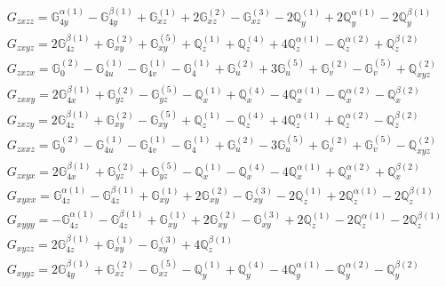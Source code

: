 \documentclass[fleqn,8pt,landscape]{jsarticle}
\begin{document}
\begin{align*}
& G_{zxzz} = \mathbb{G}_{4y}^{\alpha(1)} - \mathbb{G}_{4y}^{\beta(1)} + \mathbb{G}_{xz}^{(1)} + 2 \mathbb{G}_{xz}^{(2)} - \mathbb{G}_{xz}^{(3)} - 2 \mathbb{Q}_{y}^{(1)} + 2 \mathbb{Q}_{y}^{\alpha(1)} - 2 \mathbb{Q}_{y}^{\beta(1)} \\
& G_{zxyz} = 2 \mathbb{G}_{4z}^{\beta(1)} + \mathbb{G}_{xy}^{(2)} + \mathbb{G}_{xy}^{(5)} + \mathbb{Q}_{z}^{(1)} + \mathbb{Q}_{z}^{(4)} + 4 \mathbb{Q}_{z}^{\alpha(1)} - \mathbb{Q}_{z}^{\alpha(2)} + \mathbb{Q}_{z}^{\beta(2)} \\
& G_{zxzx} = \mathbb{G}_{0}^{(2)} - \mathbb{G}_{4u}^{(1)} - \mathbb{G}_{4v}^{(1)} - \mathbb{G}_{4}^{(1)} + \mathbb{G}_{u}^{(2)} + 3 \mathbb{G}_{u}^{(5)} + \mathbb{G}_{v}^{(2)} - \mathbb{G}_{v}^{(5)} + \mathbb{Q}_{xyz}^{(2)} \\
& G_{zxxy} = 2 \mathbb{G}_{4x}^{\beta(1)} + \mathbb{G}_{yz}^{(2)} - \mathbb{G}_{yz}^{(5)} - \mathbb{Q}_{x}^{(1)} + \mathbb{Q}_{x}^{(4)} - 4 \mathbb{Q}_{x}^{\alpha(1)} - \mathbb{Q}_{x}^{\alpha(2)} - \mathbb{Q}_{x}^{\beta(2)} \\
& G_{zxzy} = 2 \mathbb{G}_{4z}^{\beta(1)} + \mathbb{G}_{xy}^{(2)} - \mathbb{G}_{xy}^{(5)} + \mathbb{Q}_{z}^{(1)} - \mathbb{Q}_{z}^{(4)} + 4 \mathbb{Q}_{z}^{\alpha(1)} + \mathbb{Q}_{z}^{\alpha(2)} - \mathbb{Q}_{z}^{\beta(2)} \\
& G_{zxxz} = \mathbb{G}_{0}^{(2)} - \mathbb{G}_{4u}^{(1)} - \mathbb{G}_{4v}^{(1)} - \mathbb{G}_{4}^{(1)} + \mathbb{G}_{u}^{(2)} - 3 \mathbb{G}_{u}^{(5)} + \mathbb{G}_{v}^{(2)} + \mathbb{G}_{v}^{(5)} - \mathbb{Q}_{xyz}^{(2)} \\
& G_{zxyx} = 2 \mathbb{G}_{4x}^{\beta(1)} + \mathbb{G}_{yz}^{(2)} + \mathbb{G}_{yz}^{(5)} - \mathbb{Q}_{x}^{(1)} - \mathbb{Q}_{x}^{(4)} - 4 \mathbb{Q}_{x}^{\alpha(1)} + \mathbb{Q}_{x}^{\alpha(2)} + \mathbb{Q}_{x}^{\beta(2)} \\
& G_{xyxx} = \mathbb{G}_{4z}^{\alpha(1)} - \mathbb{G}_{4z}^{\beta(1)} + \mathbb{G}_{xy}^{(1)} + 2 \mathbb{G}_{xy}^{(2)} - \mathbb{G}_{xy}^{(3)} - 2 \mathbb{Q}_{z}^{(1)} + 2 \mathbb{Q}_{z}^{\alpha(1)} - 2 \mathbb{Q}_{z}^{\beta(1)} \\
& G_{xyyy} = - \mathbb{G}_{4z}^{\alpha(1)} - \mathbb{G}_{4z}^{\beta(1)} + \mathbb{G}_{xy}^{(1)} + 2 \mathbb{G}_{xy}^{(2)} - \mathbb{G}_{xy}^{(3)} + 2 \mathbb{Q}_{z}^{(1)} - 2 \mathbb{Q}_{z}^{\alpha(1)} - 2 \mathbb{Q}_{z}^{\beta(1)} \\
& G_{xyzz} = 2 \mathbb{G}_{4z}^{\beta(1)} + \mathbb{G}_{xy}^{(1)} - \mathbb{G}_{xy}^{(3)} + 4 \mathbb{Q}_{z}^{\beta(1)} \\
& G_{xyyz} = 2 \mathbb{G}_{4y}^{\beta(1)} + \mathbb{G}_{xz}^{(2)} - \mathbb{G}_{xz}^{(5)} - \mathbb{Q}_{y}^{(1)} + \mathbb{Q}_{y}^{(4)} - 4 \mathbb{Q}_{y}^{\alpha(1)} - \mathbb{Q}_{y}^{\alpha(2)} - \mathbb{Q}_{y}^{\beta(2)} \\

\end{align*}
\end{document}
